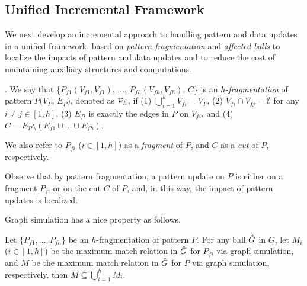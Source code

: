 \subsection{Unified Incremental Framework}



\vspace{1.0ex}
We next develop an incremental approach to handling pattern and data updates in a unified framework, based on {\em pattern fragmentation} and {\em affected balls}
to localize the impacts of pattern and data updates and to reduce the cost of maintaining auxiliary structures and computations.


. We say that \{$P_{f1}(V_{f1},V_{f1})$, $\ldots$, $P_{fh}(V_{fh},V_{fh})$, $C$\} is an {\em $h$-fragmentation} of pattern $P(V_{P}$, $E_{P})$, denoted as ${\cal P}_{h}$,
if (1) $\bigcup_{i=1}^{h}V_{fi}=V_{P}$, (2) $V_{fi}\cap V_{fj} = \emptyset$ for any $i\ne j\in[1, h]$,
(3) $E_{fi}$ is exactly the edges in $P$ on $V_{fi}$, and (4) $C=E_P \setminus (E_{f1}\cup\ldots\cup E_{fh})$.

We also refer to $P_{fi}$ ($i\in[1,h]$) as a {\em fragment} of $P$, and $C$ as a {\em cut} of $P$, respectively.

Observe that by pattern fragmentation, a pattern update on $P$ is either on a fragment $P_{fi}$ or on the cut $C$ of $P$, and, in this way, the impact of pattern updates is localized. %

\vspace{0.5ex}
Graph simulation has a nice property as follows.

\vspace{-0.5ex}
\begin{theorem}
\label{thm-compose}
Let $\{P_{f1},\ldots,P_{fh}\}$ be an $h$-fragmentation of pattern $P$.
For any ball $\hat{G}{}$ in $G$, let $M_i$ ($i\in[1,h]$) be the maximum match relation in $\hat{G}{}$ for $P_{fi}$ via graph simulation,
and $M$ be the maximum match relation in $\hat{G}{}$ for $P$ via graph simulation, respectively,
then $M\subseteq\bigcup_{i=1}^{h}M_{i}$.
\end{theorem}

